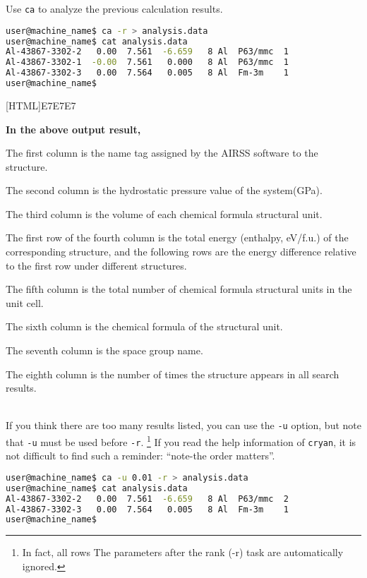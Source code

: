 \documentclass[a4paper, 10pt]{article}
\begin{document}
Use \verb|ca| to analyze the previous calculation results.
\begin{lstlisting}[language={bash}]
user@machine_name$ ca -r > analysis.data
user@machine_name$ cat analysis.data
Al-43867-3302-2   0.00  7.561  -6.659   8 Al  P63/mmc  1
Al-43867-3302-1  -0.00  7.561   0.000   8 Al  P63/mmc  1
Al-43867-3302-3   0.00  7.564   0.005   8 Al  Fm-3m    1
user@machine_name$
\end{lstlisting}

\noindent{}[HTML]{E7E7E7}{\parbox{\textwidth}{%
\noindent \textbf{In the above output result,}
\begin{maineu}
  \item The first column is the name tag assigned by the AIRSS software to the structure.
  \item The second column is the hydrostatic pressure value of the system(GPa).
  \item The third column is the volume of each chemical formula structural unit.
  \item 
  The first row of the fourth column is the total energy (enthalpy, eV/f.u.) of the corresponding structure, and the following rows are the energy difference relative to the first row under different structures.
  \item The fifth column is the total number of chemical formula structural units in the unit cell.
  \item The sixth column is the chemical formula of the structural unit.
  \item The seventh column is the space group name.
  \item The eighth column is the number of times the structure appears in all search results.
\end{maineu}}}\\

If you think there are too many results listed, you can use the \verb|-u| option, but note that \verb|-u| must be used before \verb|-r|. \footnote{In fact, all rows The parameters after the rank (-r) task are automatically ignored.} If you read the help information of \verb|cryan|, it is not difficult to find such a reminder: ``note-the order matters''.
\begin{lstlisting}[language={bash}]
user@machine_name$ ca -u 0.01 -r > analysis.data
user@machine_name$ cat analysis.data
Al-43867-3302-2   0.00  7.561  -6.659   8 Al  P63/mmc  2
Al-43867-3302-3   0.00  7.564   0.005   8 Al  Fm-3m    1
user@machine_name$
\end{lstlisting}
\end{document}
